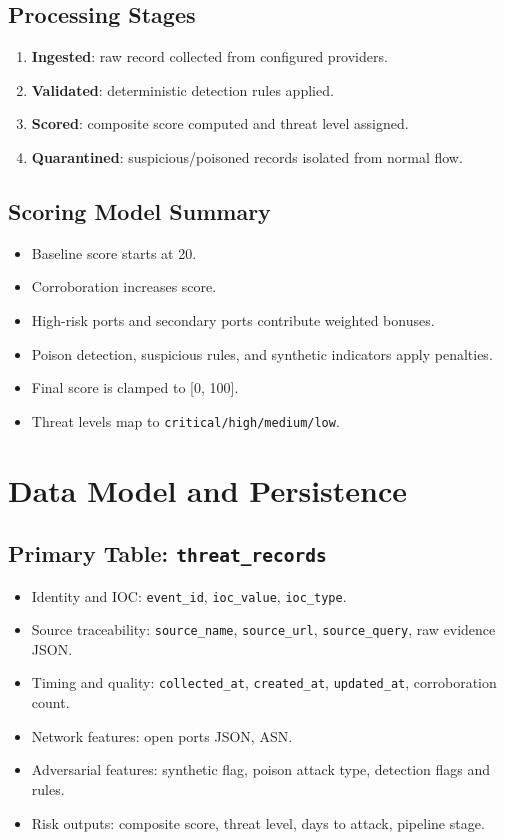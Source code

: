 \documentclass[11pt,a4paper]{article}
\begin{document}
\subsection{Processing Stages}
\begin{enumerate}[leftmargin=1.5em]
  \item \textbf{Ingested}: raw record collected from configured providers.
  \item \textbf{Validated}: deterministic detection rules applied.
  \item \textbf{Scored}: composite score computed and threat level assigned.
  \item \textbf{Quarantined}: suspicious/poisoned records isolated from normal flow.
\end{enumerate}

\subsection{Scoring Model Summary}
\begin{itemize}[leftmargin=1.5em]
  \item Baseline score starts at 20.
  \item Corroboration increases score.
  \item High-risk ports and secondary ports contribute weighted bonuses.
  \item Poison detection, suspicious rules, and synthetic indicators apply penalties.
  \item Final score is clamped to [0, 100].
  \item Threat levels map to \texttt{critical/high/medium/low}.
\end{itemize}

\section{Data Model and Persistence}
\subsection{Primary Table: \texttt{threat\_records}}
\begin{itemize}[leftmargin=1.5em]
  \item Identity and IOC: \texttt{event\_id}, \texttt{ioc\_value}, \texttt{ioc\_type}.
  \item Source traceability: \texttt{source\_name}, \texttt{source\_url}, \texttt{source\_query}, raw evidence JSON.
  \item Timing and quality: \texttt{collected\_at}, \texttt{created\_at}, \texttt{updated\_at}, corroboration count.
  \item Network features: open ports JSON, ASN.
  \item Adversarial features: synthetic flag, poison attack type, detection flags and rules.
  \item Risk outputs: composite score, threat level, days to attack, pipeline stage.
\end{itemize}
\end{document}
